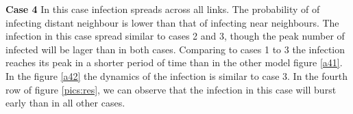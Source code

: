 
\textbf{Case 4}
In this case infection spreads across all links. The probability of of infecting distant neighbour is lower than that of infecting near neighbours. The infection in this case spread similar to cases 2 and 3, though the peak number of infected will be lager than in both cases. Comparing to cases 1 to 3 the infection reaches its peak in a shorter period of time than in the other model figure \ref{a41}. In the figure \ref{a42} the dynamics of the infection is similar to case 3. In the fourth row of figure \ref{pics:res}, we can observe that the infection  in this case will burst early than in all other cases.


